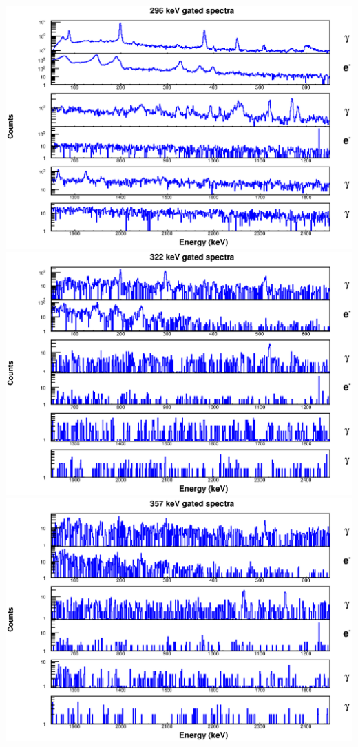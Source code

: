 \begin{landscape}
\includegraphics[scale=1.1]{156Gd_Appendix/296_combined.eps}
\includegraphics[scale=1.1]{156Gd_Appendix/322_combined.eps}
\includegraphics[scale=1.1]{156Gd_Appendix/357_combined.eps}

\end{landscape}

